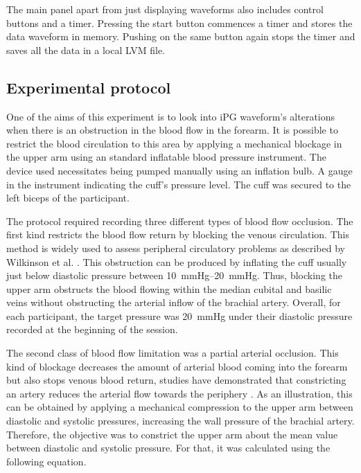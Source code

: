 The main panel apart from just displaying waveforms also includes control buttons and a timer.  Pressing the start button commences a timer and stores the data waveform in memory. Pushing on the same button again stops the timer and saves all the data in a local LVM file. 


\subsection{Experimental protocol}
\label{section procedure 1.3}

One of the aims of this experiment is to look into iPG waveform's alterations when there is an obstruction in the blood flow in the forearm. It is possible to restrict the blood circulation to this area by applying a mechanical blockage in the upper arm using an standard inflatable blood pressure instrument. The device used necessitates being pumped manually using an inflation bulb. A gauge in the instrument indicating the cuff's pressure level. The cuff was secured to the left biceps of the participant. 

The protocol required recording three different types of blood flow occlusion. The first kind restricts the blood flow return by blocking the venous circulation. This method is widely used to assess peripheral circulatory problems as described by Wilkinson et al. \cite{wilkinson2001venous}. This obstruction can be produced by inflating the cuff usually just below diastolic pressure between \SIrange{10}{20}{\mmHg}. Thus, blocking the upper arm obstructs the blood flowing within the median cubital and basilic veins without obstructing the arterial inflow of the brachial artery.  Overall, for each participant, the target pressure was \SI{20}{\mmHg} under their diastolic pressure recorded at the beginning of the session.

The second class of blood flow limitation was a partial arterial occlusion. This kind of blockage decreases the amount of arterial blood coming into the forearm but also stops venous blood return, studies have demonstrated that constricting an artery reduces the arterial flow towards the periphery \cite{uchida1977cyclical}. As an illustration, this can be obtained by applying a mechanical compression to the upper arm between diastolic and systolic pressures, increasing the wall pressure of the brachial artery. Therefore, the objective was to constrict the upper arm about the mean value between diastolic and systolic pressure. For that, it was calculated using the following equation.

